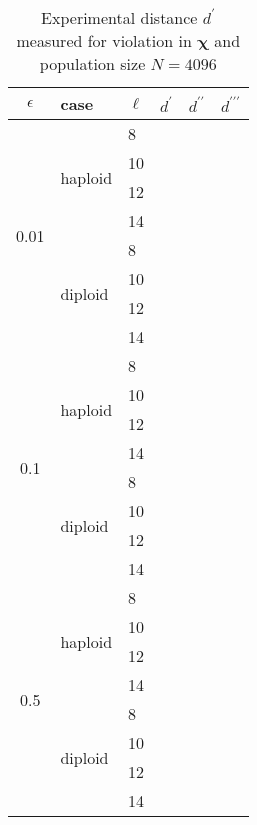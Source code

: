 \begin{table}[ht]
\caption{Experimental distance $d^\prime$ measured for violation in $\bm{\chi}$ and population size $N = 4096$ }
\centering
\begin{tabularx}{0.75\textwidth}{ c *{5}{X}}
\toprule
$\epsilon$ & case & $\ell$ & $d^\prime$ & $d^{\prime\prime}$ & $d^{\prime\prime\prime}$ \\
\midrule
\multirow{8}{*}{0.01} & \multirow{4}{*}{haploid} 	& 8 & 	&  	&  \\
		      &   				& 10 & 	&  	&  \\ 
		      & 			 	& 12 & 	&  	&  \\
		      &  	 			& 14 & 	&  	&  \\ 
		      \cmidrule(l){2-6}
		      & \multirow{4}{*}{diploid} 	& 8 & 	&  	&  \\
		      &  	 			& 10 & 	&  	&  \\
		      & 			 	& 12 & 	&  	&  \\
		      &  	 			& 14 & 	&  	&  \\
		      \midrule
\multirow{8}{*}{0.1} & \multirow{4}{*}{haploid} 	& 8 &	&  	&  \\
		      &   				& 10 & 	&  	&  \\	
		      & 				& 12 & 	&  	&  \\	
		      &  	 			& 14 & 	&  	&  \\
		      \cmidrule(l){2-6}
		      & \multirow{4}{*}{diploid} 	& 8 & 	&  	&  \\
		      &  	 			& 10 & 	&  	&  \\
		      & 				& 12 & 	&  	&  \\
		      &  	 			& 14 & 	&  	&  \\
		      \midrule
\multirow{8}{*}{0.5} & \multirow{4}{*}{haploid} 	& 8 & 	&  	&  \\
		      &   				& 10 &	&  	&  \\
		      & 				& 12 & 	&  	&  \\
		      &  	 			& 14 & 	&  	&  \\
		      \cmidrule(l){2-6}
		      & \multirow{4}{*}{diploid} 	& 8 & 	&  	&  \\	
		      &  	 			& 10 &	&  	&  \\
		      &  				& 12 & 	&  	&  \\
		      &  	 			& 14 & 	&  	&  \\
\bottomrule
\end{tabularx}
\label{distanceChi}
\end{table} 


